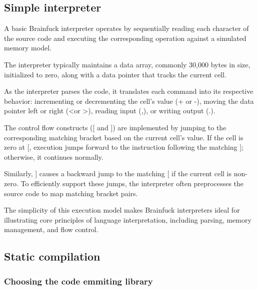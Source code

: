 \par 

\subsection{Simple interpreter}
\label{sec:ch2sec2sub2}

\par A basic Brainfuck interpreter operates by sequentially reading each character of the source code and executing the corresponding operation against a simulated memory model.

\par The interpreter typically maintains a data array, commonly 30,000 bytes in size, initialized to zero, along with a data pointer that tracks the current cell.

\par As the interpreter parses the code, it translates each command into its respective behavior: incrementing or decrementing the cell's value (+ or -), moving the data pointer left or right (\textless or \textgreater), reading input (,), or writing output (.).

\par The control flow constructs ([ and ]) are implemented by jumping to the corresponding matching bracket based on the current cell's value. If the cell is zero at [, execution jumps forward to the instruction following the matching ]; otherwise, it continues normally.

\par Similarly, ] causes a backward jump to the matching [ if the current cell is non-zero. To efficiently support these jumps, the interpreter often preprocesses the source code to map matching bracket pairs.

\par The simplicity of this execution model makes Brainfuck interpreters ideal for illustrating core principles of language interpretation, including parsing, memory management, and flow control.

\subsection{Static compilation}
\label{sec:ch2sec2sub3}

\subsubsection{Choosing the code emmiting library}
\label{sec:ch2sec2sub3sec1}

